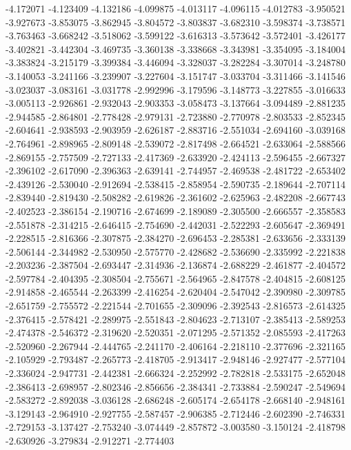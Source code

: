 -4.172071
-4.123409
-4.132186
-4.099875
-4.013117
-4.096115
-4.012783
-3.950521
-3.927673
-3.853075
-3.862945
-3.804572
-3.803837
-3.682310
-3.598374
-3.738571
-3.763463
-3.668242
-3.518062
-3.599122
-3.616313
-3.573642
-3.572401
-3.426177
-3.402821
-3.442304
-3.469735
-3.360138
-3.338668
-3.343981
-3.354095
-3.184004
-3.383824
-3.215179
-3.399384
-3.446094
-3.328037
-3.282284
-3.307014
-3.248780
-3.140053
-3.241166
-3.239907
-3.227604
-3.151747
-3.033704
-3.311466
-3.141546
-3.023037
-3.083161
-3.031778
-2.992996
-3.179596
-3.148773
-3.227855
-3.016633
-3.005113
-2.926861
-2.932043
-2.903353
-3.058473
-3.137664
-3.094489
-2.881235
-2.944585
-2.864801
-2.778428
-2.979131
-2.723880
-2.770978
-2.803533
-2.852345
-2.604641
-2.938593
-2.903959
-2.626187
-2.883716
-2.551034
-2.694160
-3.039168
-2.764961
-2.898965
-2.809148
-2.539072
-2.817498
-2.664521
-2.633064
-2.588566
-2.869155
-2.757509
-2.727133
-2.417369
-2.633920
-2.424113
-2.596455
-2.667327
-2.396102
-2.617090
-2.396363
-2.639141
-2.744957
-2.469538
-2.481722
-2.653402
-2.439126
-2.530040
-2.912694
-2.538415
-2.858954
-2.590735
-2.189644
-2.707114
-2.839440
-2.819430
-2.508282
-2.619826
-2.361602
-2.625963
-2.482208
-2.667743
-2.402523
-2.386154
-2.190716
-2.674699
-2.189089
-2.305500
-2.666557
-2.358583
-2.551878
-2.314215
-2.646415
-2.754690
-2.442031
-2.522293
-2.605647
-2.369491
-2.228515
-2.816366
-2.307875
-2.384270
-2.696453
-2.285381
-2.633656
-2.333139
-2.506144
-2.344982
-2.530950
-2.575770
-2.428682
-2.536690
-2.335992
-2.221838
-2.203236
-2.387504
-2.693447
-2.314936
-2.136874
-2.688229
-2.461877
-2.404572
-2.597784
-2.404395
-2.308504
-2.755671
-2.564965
-2.847578
-2.404815
-2.608125
-2.914858
-2.465544
-2.263399
-2.416254
-2.620404
-2.547042
-2.390980
-2.309785
-2.651759
-2.755572
-2.221544
-2.701655
-2.309096
-2.392543
-2.816573
-2.614325
-2.376415
-2.578421
-2.289975
-2.551843
-2.804623
-2.713107
-2.385413
-2.589253
-2.474378
-2.546372
-2.319620
-2.520351
-2.071295
-2.571352
-2.085593
-2.417263
-2.520960
-2.267944
-2.444765
-2.241170
-2.406164
-2.218110
-2.377696
-2.321165
-2.105929
-2.793487
-2.265773
-2.418705
-2.913417
-2.948146
-2.927477
-2.577104
-2.336024
-2.947731
-2.442381
-2.666324
-2.252992
-2.782818
-2.533175
-2.652048
-2.386413
-2.698957
-2.802346
-2.856656
-2.384341
-2.733884
-2.590247
-2.549694
-2.583272
-2.892038
-3.036128
-2.686248
-2.605174
-2.654178
-2.668140
-2.948161
-3.129143
-2.964910
-2.927755
-2.587457
-2.906385
-2.712446
-2.602390
-2.746331
-2.729153
-3.137427
-2.753240
-3.074449
-2.857872
-3.003580
-3.150124
-2.418798
-2.630926
-3.279834
-2.912271
-2.774403
